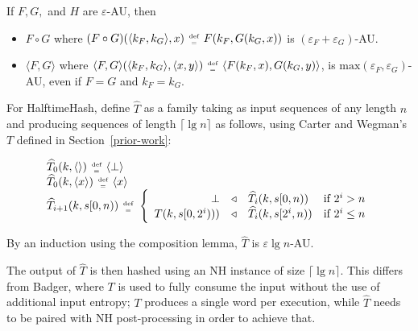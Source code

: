 \documentclass[runningheads]{llncs}
\newcommand{\defeq}{\;\genfrac{}{}{0pt}{2}{\text{def}}{=}\;}
\begin{document}
\begin{lemma}
  If $F, G,$ and $H$ are $\varepsilon$-AU, then
  \begin{itemize}
  \item $F \circ G$ where $(F \circ G) (\langle k_F, k_G \rangle, x) \defeq F(k_F,G(k_G, x))$ is $(\varepsilon_F + \varepsilon_G)$-AU.
  \item $\langle F, G\rangle$ where $\langle F, G \rangle(\langle k_F, k_G \rangle, \langle x, y \rangle) \defeq \langle F(k_F,x), G(k_G,y) \rangle$, is $\text{max}(\varepsilon_F, \varepsilon_G)$-AU, even if $F=G$ and $k_F = k_G$.
  \end{itemize}
\end{lemma}

For HalftimeHash, define $\widehat{T}$ as a family taking as input sequences of any length $n$ and producing sequences of length $\lceil \lg n \rceil$ as follows, using Carter and Wegman's $T$ defined in Section~\ref{prior-work}:

\begin{equation}
\begin{array}{l}
\widehat{T}_0(k, \langle \rangle) \defeq \langle \bot \rangle \\
\widehat{T}_0(k, \langle x \rangle) \defeq \langle x \rangle \\
\widehat{T}_{i+1}(k, s[0,n)) \defeq \left\{ 
  \begin{array}{rcll}
   \bot &\triangleleft& \widehat{T}_i(k, s[0,n)) & \text{if } 2^i > n \\
    T(k, s[0, 2^i))) &\triangleleft& \widehat{T}_{i}(k,s[2^i, n)) & \text{if } 2^i \le n
  \end{array}
  \right.
\end{array}
\end{equation}

By an induction using the composition lemma, $\widehat{T}$ is $\varepsilon \lg n$-AU.

The output of $\widehat{T}$ is then hashed using an NH instance of size $\lceil \lg n \rceil$.
This differs from Badger, where $T$ is used to fully consume the input without the use of additional input entropy;
$T$ produces a single word per execution, while $\widehat{T}$ needs to be paired with NH post-processing in order to achieve that.
\end{document}
